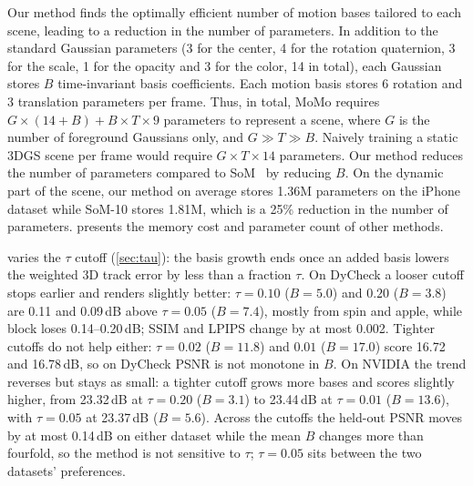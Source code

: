 
Our method finds the optimally efficient number of motion bases tailored to each scene, leading to a reduction in the number of parameters. In addition to the standard Gaussian parameters (3 for the center, 4 for the rotation quaternion, 3 for the scale, 1 for the opacity and 3 for the color, 14 in total), each Gaussian stores $B$ time-invariant basis coefficients. Each motion basis stores 6 rotation and 3 translation parameters per frame. Thus, in total, MoMo requires $G \times (14 + B) + B \times T \times 9$ parameters to represent a scene, where $G$ is the number of foreground Gaussians only, and $G \gg T \gg B$. Naively training a static 3DGS scene per frame would require $G \times T \times 14$ parameters. Our method reduces the number of parameters compared to SoM~\cite{wang2025shape} by reducing $B$. On the dynamic part of the scene, our method on average stores 1.36M parameters on the iPhone dataset while SoM-10 stores 1.81M, which is a 25\% reduction in the number of parameters.  presents the memory cost and parameter count of other methods. %




 varies the $\tau$ cutoff (\cref{sec:tau}): the basis growth ends once an added basis lowers the weighted 3D track error by less than a fraction $\tau$.
On DyCheck a looser cutoff stops earlier and renders slightly better: $\tau = 0.10$ ($B = 5.0$) and $0.20$ ($B = 3.8$) are 0.11 and 0.09\,dB above $\tau = 0.05$ ($B = 7.4$), mostly from spin and apple, while block loses 0.14--0.20\,dB; SSIM and LPIPS change by at most 0.002. Tighter cutoffs do not help either: $\tau = 0.02$ ($B = 11.8$) and $0.01$ ($B = 17.0$) score 16.72 and 16.78\,dB, so on DyCheck PSNR is not monotone in $B$.
On NVIDIA the trend reverses but stays as small: a tighter cutoff grows more bases and scores slightly higher, from 23.32\,dB at $\tau = 0.20$ ($B = 3.1$) to 23.44\,dB at $\tau = 0.01$ ($B = 13.6$), with $\tau = 0.05$ at 23.37\,dB ($B = 5.6$). Across the cutoffs the held-out PSNR moves by at most 0.14\,dB on either dataset while the mean $B$ changes more than fourfold, so the method is not sensitive to $\tau$; $\tau = 0.05$ sits between the two datasets' preferences.

